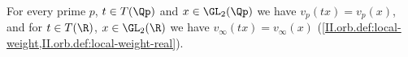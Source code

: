 For every prime $p$, $t\in T(\Qp)$ and $x\in\GL_2(\Qp)$ we have $v_p(tx)=v_p(x)$, and for $t\in T(\R)$, $x\in\GL_2(\R)$ we have $v_\infty(tx)=v_\infty(x)$
(\cref{II.orb.def:local-weight,II.orb.def:local-weight-real}).
